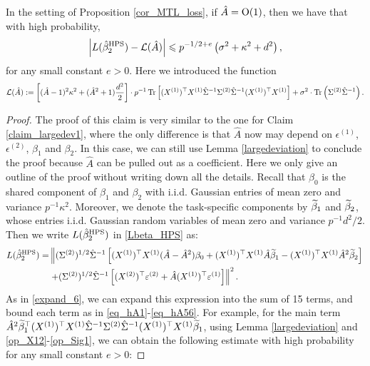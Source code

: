  \begin{claim}\label{claim_largedev2}
 In the setting of Proposition \ref{cor_MTL_loss}, if $\hat A=\operatorname{O}(1)$, then we have that with high probability,
$$\left| L(\hat{\beta}_2^{\textup{HPS}})- \mathcal L(\hat A)\right| \leqslant p^{-1/2+e} \left(\sigma^2 +\kappa^2 +d^2 \right),$$
for any small constant $e>0$. Here we introduced the function
\begin{align*}
	\mathcal L(\hat A)	:=  \left[(\hat A-1)^2 \kappa^2 + (\hat A^2+1)\frac{d^2}2\right] \cdot p^{-1}\operatorname{Tr}\left[ (X^{(1)})^{\top}X^{(1)} \hat\Sigma^{-1} \Sigma^{(2)} \hat\Sigma^{-1} (X^{(1)})^{\top}X^{(1)} \right] +\sigma^2\cdot \operatorname{Tr}\left(\Sigma^{(2)}\hat \Sigma^{-1}\right).
\end{align*}
 \end{claim}
 \begin{proof}
 The proof of this claim is very similar to the one for Claim \ref{claim_largedev1}, where the only difference is that $\hat A$ now may depend on $\epsilon^{(1)}$, $\epsilon^{(2)}$, $\beta_1$ and $\beta_2$. In this case, we can still use  Lemma \ref{largedeviation} to conclude the proof because $\hat A$ can be pulled out as a coefficient. Here we only give an outline of the proof without writing down all the details. Recall that $\beta_0$ is the shared component of $\beta_1$ and $\beta_2$ with i.i.d. Gaussian entries of mean zero and variance $p^{-1}\kappa^2$. Moreover, we denote the task-specific components by $\widetilde\beta_1$ and $\widetilde\beta_2$, whose entries i.i.d. Gaussian random variables of mean zero and variance $p^{-1} d^2 / 2$. Then we write $L(\hat{\beta}_2^{\textup{HPS}}) $ in \eqref{Lbeta_HPS} as:
 \begin{align}
L(\hat{\beta}_2^{\textup{HPS}})  =&  \left\| (\Sigma^{(2)})^{1/2}\hat \Sigma^{-1} \left[(X^{(1)})^\top X^{(1)} (\hat A -\hat A^2)\beta_0+(X^{(1)})^\top X^{(1)} \hat A\widetilde \beta_1 - (X^{(1)})^\top X^{(1)}  \hat A^2\widetilde \beta_2 \right] \right. \\
&\left. + (\Sigma^{(2)})^{1/2}\hat \Sigma^{-1}\left[ (X^{(2)})^\top \varepsilon^{(2)} + \hat A   (X^{(1)})^\top \varepsilon^{(1)} \right]\right\|^2. \label{expand_15}
\end{align}
As in \eqref{expand_6}, we can expand this expression into the sum of 15 terms, and bound each term as in \eqref{eq_hA1}-\eqref{eq_hA56}. For example, for the main term $\hat A^2 \widetilde \beta_1^\top (X^{(1)})^\top X^{(1)} \hat \Sigma^{-1}  \Sigma^{(2)} \hat \Sigma^{-1}  (X^{(1)})^\top X^{(1)}\widetilde\beta_1$, using 
Lemma \ref{largedeviation} and \eqref{op_X12}-\eqref{op_Sig1}, we can obtain the following estimate with high probability for any small constant $e>0$:

\end{proof}
